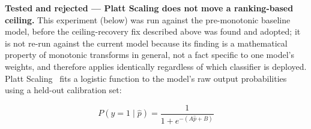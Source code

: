 \documentclass[conference]{IEEEtran}
\begin{document}
\textbf{Tested and rejected --- Platt Scaling does not move a ranking-based
ceiling.} This experiment (below) was run against the pre-monotonic
baseline model, before the ceiling-recovery fix described above was found
and adopted; it is not re-run against the current model because its
finding is a mathematical property of monotonic transforms in general, not
a fact specific to one model's weights, and therefore applies identically
regardless of which classifier is deployed. Platt Scaling~\cite{platt1999}
fits a logistic function to the model's raw output probabilities using a
held-out calibration set:

\begin{equation}
    P(y=1 \mid \hat{p}) = \frac{1}{1 + e^{-(A\hat{p} + B)}}
    \label{eq:platt}
\end{equation}
\end{document}
